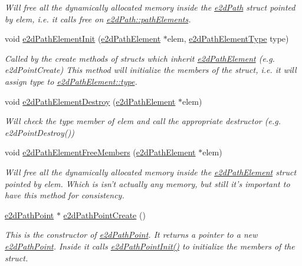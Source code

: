 \begin{DoxyCompactItemize}
\begin{DoxyCompactList}\small\item\em Will free all the dynamically allocated memory inside the \hyperlink{structe2dPath}{e2d\-Path} struct pointed by elem, i.\-e. it calls free on \hyperlink{structe2dPath_ac0c8a45ff4f8d02e557fb33887743439}{e2d\-Path\-::path\-Elements}. \end{DoxyCompactList}\item 
void \hyperlink{group__e2dPath_ga9d46085324faa70a4bc9134c5bb6f5ad}{e2d\-Path\-Element\-Init} (\hyperlink{structe2dPathElement}{e2d\-Path\-Element} $\ast$elem, \hyperlink{group__e2dPath_gabecf8438085bebe6b28b4a8fb69b1507}{e2d\-Path\-Element\-Type} type)
\begin{DoxyCompactList}\small\item\em Called by the create methods of structs which inherit \hyperlink{structe2dPathElement}{e2d\-Path\-Element} (e.\-g. e2d\-Point\-Create) This method will initialize the members of the struct, i.\-e. it will assign type to \hyperlink{structe2dPathElement_acb2ed01d1856b82777314d8eb8f66b01}{e2d\-Path\-Element\-::type}. \end{DoxyCompactList}\item 
void \hyperlink{group__e2dPath_ga2432949311d4f4a1df98e24d28814fee}{e2d\-Path\-Element\-Destroy} (\hyperlink{structe2dPathElement}{e2d\-Path\-Element} $\ast$elem)
\begin{DoxyCompactList}\small\item\em Will check the type member of elem and call the appropriate destructor (e.\-g. e2d\-Point\-Destroy()) \end{DoxyCompactList}\item 
void \hyperlink{group__e2dPath_ga38c8b4fad1e211dc5ecf36e04835edb4}{e2d\-Path\-Element\-Free\-Members} (\hyperlink{structe2dPathElement}{e2d\-Path\-Element} $\ast$elem)
\begin{DoxyCompactList}\small\item\em Will free all the dynamically allocated memory inside the \hyperlink{structe2dPathElement}{e2d\-Path\-Element} struct pointed by elem. Which is isn't actually any memory, but still it's important to have this method for consistency. \end{DoxyCompactList}\item 
\hyperlink{structe2dPathPoint}{e2d\-Path\-Point} $\ast$ \hyperlink{group__e2dPath_gaca8c21a10fb406bdbe1ac9ac827a9fc1}{e2d\-Path\-Point\-Create} ()
\begin{DoxyCompactList}\small\item\em This is the constructor of \hyperlink{structe2dPathPoint}{e2d\-Path\-Point}. It returns a pointer to a new \hyperlink{structe2dPathPoint}{e2d\-Path\-Point}. Inside it calls \hyperlink{group__e2dPath_ga482d1c32fa683b06711b1789fab97c3f}{e2d\-Path\-Point\-Init()} to initialize the members of the struct. \end{DoxyCompactList}\item 

\end{DoxyCompactItemize}
